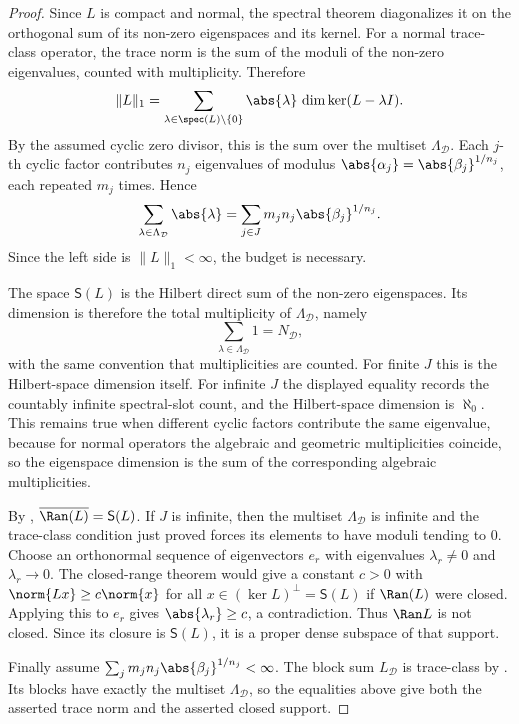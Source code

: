 \begin{proof}
  Since \(L\) is compact and normal, the spectral theorem diagonalizes it
  on the orthogonal sum of its non-zero eigenspaces and its kernel. For a
  normal trace-class operator, the trace norm is the sum of the moduli of
  the non-zero eigenvalues, counted with multiplicity. Therefore
  \[
    \|L\|_1
    =\sum_{\lambda\in\spec(L)\setminus\{0\}}
      \abs{\lambda}\,\dim\ker(L-\lambda I).
  \]
  By the assumed cyclic zero divisor, this is the sum over the multiset
  \(\Lambda_{\mathcal D}\). Each \(j\)-th cyclic factor contributes
  \(n_j\) eigenvalues of modulus
  \(\abs{\alpha_j}=\abs{\beta_j}^{1/n_j}\), each repeated \(m_j\) times.
  Hence
  \[
    \sum_{\lambda\in\Lambda_{\mathcal D}}\abs{\lambda}
    =\sum_{j\in J}m_j n_j\abs{\beta_j}^{1/n_j}.
  \]
  Since the left side is \(\|L\|_1<\infty\), the budget is necessary.

  The space \(\mathsf S(L)\) is the Hilbert direct sum of the non-zero
  eigenspaces. Its dimension is therefore the total multiplicity of
  \(\Lambda_{\mathcal D}\), namely
  \[
    \sum_{\lambda\in\Lambda_{\mathcal D}}1
    =N_{\mathcal D},
  \]
  with the same convention that multiplicities are counted. For finite
  \(J\) this is the Hilbert-space dimension itself. For infinite \(J\) the
  displayed equality records the countably infinite spectral-slot count,
  and the Hilbert-space dimension is \(\aleph_0\). This remains true when
  different cyclic factors contribute the same eigenvalue, because for
  normal operators the algebraic and geometric multiplicities coincide, so
  the eigenspace dimension is the sum of the corresponding algebraic
  multiplicities.

  By ,
  \(\overline{\Ran(L)}=\mathsf S(L)\). If \(J\) is infinite, then
  the multiset \(\Lambda_{\mathcal D}\) is infinite and the trace-class
  condition just proved forces its elements to have moduli tending to
  \(0\). Choose an orthonormal sequence of eigenvectors \(e_r\) with
  eigenvalues \(\lambda_r\ne0\) and \(\lambda_r\to0\). The closed-range
  theorem would give a constant \(c>0\) with
  \(\norm{Lx}\ge c\norm{x}\) for all
  \(x\in(\ker L)^\perp=\mathsf S(L)\) if \(\Ran(L)\) were closed.
  Applying this to \(e_r\) gives \(\abs{\lambda_r}\ge c\), a
  contradiction. Thus \(\Ran L\) is not closed. Since its closure
  is \(\mathsf S(L)\), it is a proper dense subspace of that support.

  Finally assume
  \(\sum_jm_jn_j\abs{\beta_j}^{1/n_j}<\infty\). The block sum
  \(L_{\mathcal D}\) is trace-class by
  . Its blocks have exactly the
  multiset \(\Lambda_{\mathcal D}\), so the equalities above give both the
  asserted trace norm and the asserted closed support.
\end{proof}

